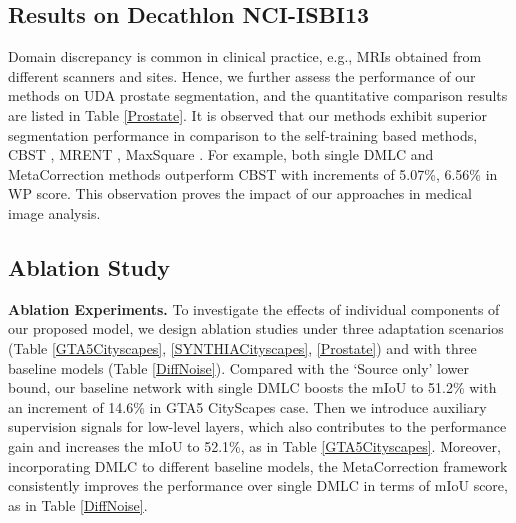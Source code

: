 \documentclass[final]{cvpr}
\begin{document}
\subsection{Results on Decathlon  NCI-ISBI13}
Domain discrepancy is common in clinical practice, e.g., MRIs obtained from different scanners and sites. Hence, we further assess the performance of our methods on UDA prostate segmentation, and the quantitative comparison results are listed in Table \ref{Prostate}. It is observed that our methods exhibit superior segmentation performance in comparison to the self-training based methods, CBST \cite{zou2018unsupervised}, MRENT \cite{zou2019confidence}, MaxSquare \cite{chen2019domain}. For example, both single DMLC and MetaCorrection methods outperform CBST with increments of 5.07\%, 6.56\% in WP  score. This observation proves the impact of our approaches in medical image analysis. 

\subsection{Ablation Study}
\textbf{Ablation Experiments.}
To investigate the effects of individual components of our proposed model, we design ablation studies under three adaptation scenarios (Table \ref{GTA5Cityscapes}, \ref{SYNTHIACityscapes}, \ref{Prostate}) and with three baseline models (Table \ref{DiffNoise}).  Compared with the `Source only' lower bound, our baseline network with single DMLC boosts the mIoU to 51.2\% with an increment of 14.6\% in GTA5  CityScapes case. Then we introduce auxiliary supervision signals for low-level layers, which also contributes to the performance gain and increases the mIoU to 52.1\%, as in Table \ref{GTA5Cityscapes}. Moreover, incorporating DMLC to different baseline models, the MetaCorrection framework consistently improves the performance over single DMLC in terms of mIoU score, as in Table \ref{DiffNoise}. 
\end{document}
